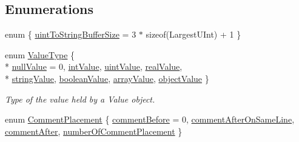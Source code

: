 \subsection*{Enumerations}
\begin{DoxyCompactItemize}
\item 
enum \{ \hyperlink{namespaceJson_a0c5f614b019f20b4598dcaec09d9e820ae4f2008c7919f20d81286121d1374424}{uint\+To\+String\+Buffer\+Size} = 3 $\ast$ sizeof(Largest\+U\+Int) + 1
 \}
\item 
enum \hyperlink{namespaceJson_a7d654b75c16a57007925868e38212b4e}{Value\+Type} \{ \\*
\hyperlink{namespaceJson_a7d654b75c16a57007925868e38212b4ea7d9899633b4409bd3fc107e6737f8391}{null\+Value} = 0, 
\hyperlink{namespaceJson_a7d654b75c16a57007925868e38212b4eae5a9d708d5c9e23ae9bf98898522512d}{int\+Value}, 
\hyperlink{namespaceJson_a7d654b75c16a57007925868e38212b4eaea788d9a3bb00adc6d68d97d43e1ccd3}{uint\+Value}, 
\hyperlink{namespaceJson_a7d654b75c16a57007925868e38212b4eab837c7b869c14d8be712deb45c9e490e}{real\+Value}, 
\\*
\hyperlink{namespaceJson_a7d654b75c16a57007925868e38212b4ea804ef857affea2d415843c73f261c258}{string\+Value}, 
\hyperlink{namespaceJson_a7d654b75c16a57007925868e38212b4ea14c30dbf4da86f7b809be299f671f7fd}{boolean\+Value}, 
\hyperlink{namespaceJson_a7d654b75c16a57007925868e38212b4eadc8f264f36b55b063c78126b335415f4}{array\+Value}, 
\hyperlink{namespaceJson_a7d654b75c16a57007925868e38212b4eae8386dcfc36d1ae897745f7b4f77a1f6}{object\+Value}
 \}\begin{DoxyCompactList}\small\item\em Type of the value held by a Value object. \end{DoxyCompactList}
\item 
enum \hyperlink{namespaceJson_a4fc417c23905b2ae9e2c47d197a45351}{Comment\+Placement} \{ \hyperlink{namespaceJson_a4fc417c23905b2ae9e2c47d197a45351a52f1733775460517b2ea6bedf4906d52}{comment\+Before} = 0, 
\hyperlink{namespaceJson_a4fc417c23905b2ae9e2c47d197a45351a008a230a0586de54f30b76afe70fdcfa}{comment\+After\+On\+Same\+Line}, 
\hyperlink{namespaceJson_a4fc417c23905b2ae9e2c47d197a45351ac5784ca53b12250888ddb642b06aebef}{comment\+After}, 
\hyperlink{namespaceJson_a4fc417c23905b2ae9e2c47d197a45351abcbd3eb00417335e094e4a03379659b5}{number\+Of\+Comment\+Placement}
 \}
\end{DoxyCompactItemize}
